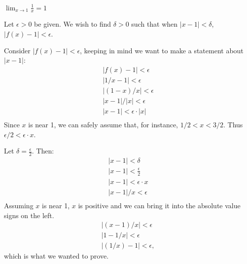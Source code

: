{$\displaystyle \lim_{x\to 1} \frac1x = 1$}
{Let $\epsilon >0$ be given. We wish to find $\delta >0$ such that when $|x-1|<\delta$, $|f(x)-1|<\epsilon$. 

Consider $|f(x)-1|<\epsilon$, keeping in  mind we want to make a statement about $|x-1|$:
\begin{gather*}
|f(x) -1 | < \epsilon \\
|1/x-1 |<\epsilon \\
| (1-x)/x | < \epsilon \\
| x-1 |/|x| < \epsilon \\
| x-1 | < \epsilon\cdot|x| \\
\end{gather*}
Since $x$ is near 1, we can safely assume that, for instance, $1/2<x<3/2$. Thus
$\epsilon/2 < \epsilon\cdot x $.

Let $\delta =\frac{\epsilon}{2}$. Then:
\begin{gather*}
|x-1|<\delta \\
|x-1| < \frac{\epsilon}{2}\\
|x-1| < \epsilon\cdot x\\
|x-1|/x < \epsilon\\
\end{gather*}
Assuming $x$ is near 1, $x$ is positive and we can bring it into the absolute value signs on the left.
\begin{gather*}
|(x-1)/x| < \epsilon\\
|1-1/x| < \epsilon\\
|(1/x) -1| < \epsilon,
\end{gather*}
which is what we wanted to prove.
}


